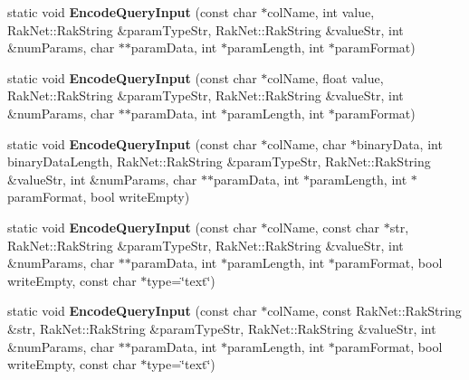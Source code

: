 \begin{DoxyCompactItemize}
\item 
\hypertarget{class_postgre_s_q_l_interface_a36dffef3013805199ceb67bb78dd23a8}{static void {\bfseries Encode\-Query\-Input} (const char $\ast$col\-Name, int value, Rak\-Net\-::\-Rak\-String \&param\-Type\-Str, Rak\-Net\-::\-Rak\-String \&value\-Str, int \&num\-Params, char $\ast$$\ast$param\-Data, int $\ast$param\-Length, int $\ast$param\-Format)}\label{class_postgre_s_q_l_interface_a36dffef3013805199ceb67bb78dd23a8}

\item 
\hypertarget{class_postgre_s_q_l_interface_ab166a775dc3d80b52aabefb973e27437}{static void {\bfseries Encode\-Query\-Input} (const char $\ast$col\-Name, float value, Rak\-Net\-::\-Rak\-String \&param\-Type\-Str, Rak\-Net\-::\-Rak\-String \&value\-Str, int \&num\-Params, char $\ast$$\ast$param\-Data, int $\ast$param\-Length, int $\ast$param\-Format)}\label{class_postgre_s_q_l_interface_ab166a775dc3d80b52aabefb973e27437}

\item 
\hypertarget{class_postgre_s_q_l_interface_a8a2fa56a979d185f7586f8b41f198fd7}{static void {\bfseries Encode\-Query\-Input} (const char $\ast$col\-Name, char $\ast$binary\-Data, int binary\-Data\-Length, Rak\-Net\-::\-Rak\-String \&param\-Type\-Str, Rak\-Net\-::\-Rak\-String \&value\-Str, int \&num\-Params, char $\ast$$\ast$param\-Data, int $\ast$param\-Length, int $\ast$param\-Format, bool write\-Empty)}\label{class_postgre_s_q_l_interface_a8a2fa56a979d185f7586f8b41f198fd7}

\item 
\hypertarget{class_postgre_s_q_l_interface_a3e0735cb9499a3aaa3c5bdf5897eca40}{static void {\bfseries Encode\-Query\-Input} (const char $\ast$col\-Name, const char $\ast$str, Rak\-Net\-::\-Rak\-String \&param\-Type\-Str, Rak\-Net\-::\-Rak\-String \&value\-Str, int \&num\-Params, char $\ast$$\ast$param\-Data, int $\ast$param\-Length, int $\ast$param\-Format, bool write\-Empty, const char $\ast$type=\char`\"{}text\char`\"{})}\label{class_postgre_s_q_l_interface_a3e0735cb9499a3aaa3c5bdf5897eca40}

\item 
\hypertarget{class_postgre_s_q_l_interface_a7bea2eeab8c64da61286d09839585894}{static void {\bfseries Encode\-Query\-Input} (const char $\ast$col\-Name, const Rak\-Net\-::\-Rak\-String \&str, Rak\-Net\-::\-Rak\-String \&param\-Type\-Str, Rak\-Net\-::\-Rak\-String \&value\-Str, int \&num\-Params, char $\ast$$\ast$param\-Data, int $\ast$param\-Length, int $\ast$param\-Format, bool write\-Empty, const char $\ast$type=\char`\"{}text\char`\"{})}\label{class_postgre_s_q_l_interface_a7bea2eeab8c64da61286d09839585894}


\end{DoxyCompactItemize}
